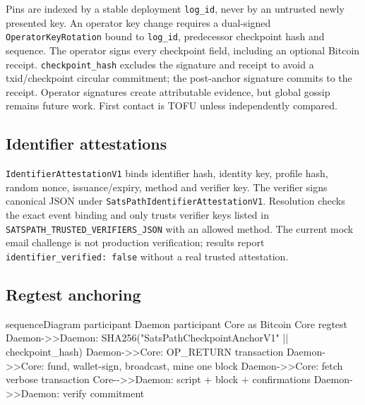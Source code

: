 \documentclass[
]{article}
\newenvironment{Shaded}{}{}
\newcommand{\NormalTok}[1]{#1}
\begin{document}
Pins are indexed by a stable deployment \texttt{log\_id}, never by an
untrusted newly presented key. An operator key change requires a
dual-signed \texttt{OperatorKeyRotation} bound to \texttt{log\_id},
predecessor checkpoint hash and sequence. The operator signs every
checkpoint field, including an optional Bitcoin receipt.
\texttt{checkpoint\_hash} excludes the signature and receipt to avoid a
txid/checkpoint circular commitment; the post-anchor signature commits
to the receipt. Operator signatures create attributable evidence, but
global gossip remains future work. First contact is TOFU unless
independently compared.

\hypertarget{identifier-attestations}{%
\subsection{Identifier attestations}\label{identifier-attestations}}

\texttt{IdentifierAttestationV1} binds identifier hash, identity key,
profile hash, random nonce, issuance/expiry, method and verifier key.
The verifier signs canonical JSON under
\texttt{SatsPathIdentifierAttestationV1}. Resolution checks the exact
event binding and only trusts verifier keys listed in
\texttt{SATSPATH\_TRUSTED\_VERIFIERS\_JSON} with an allowed method. The
current mock email challenge is not production verification; results
report \texttt{identifier\_verified:\ false} without a real trusted
attestation.

\hypertarget{regtest-anchoring}{%
\subsection{Regtest anchoring}\label{regtest-anchoring}}

\begin{Shaded}
\begin{Highlighting}[]
\NormalTok{sequenceDiagram}
\NormalTok{  participant Daemon}
\NormalTok{  participant Core as Bitcoin Core regtest}
\NormalTok{  Daemon{-}\textgreater{}\textgreater{}Daemon: SHA256("SatsPathCheckpointAnchorV1" || checkpoint\_hash)}
\NormalTok{  Daemon{-}\textgreater{}\textgreater{}Core: OP\_RETURN transaction}
\NormalTok{  Daemon{-}\textgreater{}\textgreater{}Core: fund, wallet{-}sign, broadcast, mine one block}
\NormalTok{  Daemon{-}\textgreater{}\textgreater{}Core: fetch verbose transaction}
\NormalTok{  Core{-}{-}\textgreater{}\textgreater{}Daemon: script + block + confirmations}
\NormalTok{  Daemon{-}\textgreater{}\textgreater{}Daemon: verify commitment}
\end{Highlighting}
\end{Shaded}
\end{document}
